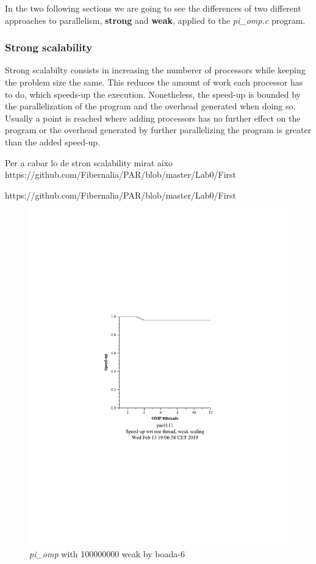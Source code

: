 \documentclass[12]{article}
\begin{document}
In the two following sections we are going to see the differences of two different approaches to parallelism, \textbf{strong} and \textbf{weak}, applied to the \textit{pi\_omp.c} program.

\subsubsection{Strong scalability}

Strong scalabilty consists in increasing the numberer of processors while keeping the problem size the same. This reduces the amount of work each processor has to do, which speeds-up the execution.
Nonetheless, the speed-up is bounded by the parallelization of the program and the overhead generated when doing so. Usually a point is reached where adding processors has no further effect on the program or the overhead generated by further parallelizing the program is greater than the added speed-up. 

Per a cabar lo de stron scalability mirat aixo https://github.com/Fibernalia/PAR/blob/master/Lab0/First%


https://github.com/Fibernalia/PAR/blob/master/Lab0/First%
\begin{figure}[H]
\centering
\includegraphics[scale=0.5]{images/pi_omp-100000000-1-12-3-weak-boada-6.png}
 \caption{ \textit{pi\_omp} with 100000000 weak by boada-6}
  \label{fig:pi_ompboada6}
\end{figure}
\end{document}
